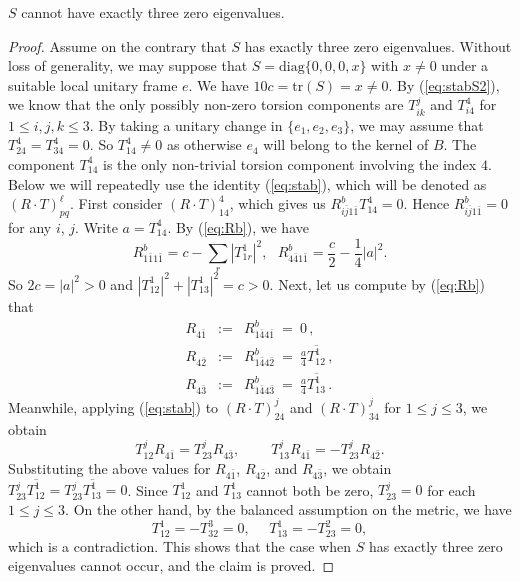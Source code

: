 \documentclass{amsart}
\begin{document}
\vspace{0.25cm}

 $S$ cannot have exactly three zero eigenvalues.
\begin{proof}
Assume on the contrary that  $S$ has exactly three zero eigenvalues. Without loss of generality, we may suppose that $S=\mbox{diag}\{ 0,0,0,x\}$ with $x\neq 0$ under a suitable local unitary frame $e$. We have $10c=\mbox{tr}(S)=x\neq  0$. By (\ref{eq:stabS2}), we know that the only possibly non-zero torsion components are $T^j_{ik}$ and $T^4_{i4}$ for $1\leq i,j,k\leq 3$. By taking  a unitary change in $\{ e_1,e_2, e_3\}$, we may assume that $T^4_{24}=T^4_{34}=0$. So $T^4_{14}\neq 0$ as otherwise $e_4$ will belong to the kernel of $B$. The component $T^4_{14}$ is the only non-trivial torsion component involving the index $4$. Below we will repeatedly use the identity (\ref{eq:stab}), which will be denoted as $(R\cdot T)^{\ell}_{pq}$. First consider $(R\cdot T)^{4}_{14}$, which gives us $R^b_{i\bar{j}1\bar{1}}T^4_{14}=0$. Hence $R^b_{i\bar{j}1\bar{1}}=0$ for any $i$, $j$. Write $a=T^4_{14}$. By (\ref{eq:Rb}), we have
$$ R^b_{1\bar{1}1\bar{1}}=c-\sum_r |T^1_{1r}|^2, \ \ \ R^b_{4\bar{4}1\bar{1}}= \frac{c}{2} - \frac{1}{4} |a|^2.$$
So $2c=|a|^2>0$ and $|T^1_{12}|^2 + |T^1_{13}|^2 =c >0$. Next,  let us compute by (\ref{eq:Rb}) that
\begin{eqnarray*}
R_{4\bar{1}}& := &  R^b_{1\bar{4}4\bar{1}} \ = \  0\,,\\
 R_{4\bar{2}}& := &  R^b_{1\bar{4}4\bar{2}} \ = \  \frac{a}{4} \overline{T^1_{12} }  \,,\\
 R_{4\bar{3}}& := &  R^b_{1\bar{4}4\bar{3}} \ = \ \frac{a}{4} \overline{T^1_{13} }\,.
\end{eqnarray*}
Meanwhile, applying (\ref{eq:stab}) to $(R\cdot T)^j_{24}$ and $(R\cdot T)^j_{34}$ for $1\leq j\leq 3$, we obtain
$$ T^j_{12}R_{4\bar{1}} =  T^j_{23}R_{4\bar{3}},\ \ \ \ \ \  \ \ \ \ T^j_{13}R_{4\bar{1}} =  -T^j_{23}R_{4\bar{2}}.$$
Substituting the above values for $R_{4\bar{1}}$, $R_{4\bar{2}}$, and $R_{4\bar{3}}$, we obtain $T^j_{23} \overline{T^1_{12}} = T^j_{23} \overline{T^1_{13}} = 0$. Since $T^1_{12}$ and $T^1_{13}$ cannot both be zero, $T^j_{23}=0$ for each $1\leq j\leq 3$. On the other hand, by the balanced assumption on the metric, we have
$$ T^1_{12}=-T^3_{32}=0, \ \ \ \ \ \ T^1_{13} = -T^2_{23}=0, $$
which is a contradiction. This shows that the case when $S$ has exactly three zero eigenvalues cannot occur, and the claim is proved.
\end{proof}
\end{document}
